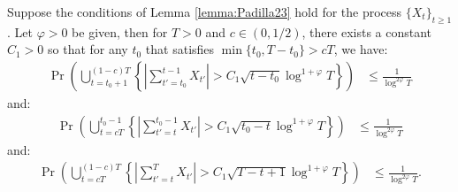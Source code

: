 \begin{lemma}\label{lemma:2}
Suppose the conditions of Lemma \ref{lemma:Padilla23} hold for the process $\{X_t\}_{t \geq 1}$. Let $\varphi > 0$ be given, then for $T > 0$ and $c \in (0,1/2)$, there exists a constant $C_1 > 0$ so that for any $t_0$ that satisfies $\min\{t_0,T-t_0\} > cT$, we have:
\begin{align*}
    \Pr \left(\bigcup_{t=t_0 + 1}^{(1-c)T}\left\{ \left|\sum_{t'=t_0}^{t-1} X_{t'}\right| > C_1\sqrt{t-t_0}\log^{1+\varphi}T\right\}\right) 
    &\leq \frac{1}{\log^{2\varphi} T}
\end{align*}
and:
\begin{align*}
    \Pr \left(\bigcup_{t=cT}^{t_0-1}\left\{ \left|\sum_{t'=t}^{t_0-1} X_{t'}\right| > C_1\sqrt{t_0-t}\log^{1+\varphi}T\right\}\right) 
    &\leq \frac{1}{\log^{2\varphi} T}
\end{align*}
and:
\begin{align*}
    \Pr \left(\bigcup_{t=cT}^{(1-c)T}\left\{ \left|\sum_{t'=t}^{T} X_{t'}\right| > C_1\sqrt{T-t+1}\log^{1+\varphi}T\right\}\right) 
    &\leq \frac{1}{\log^{2\varphi} T}.
\end{align*}
\end{lemma}

